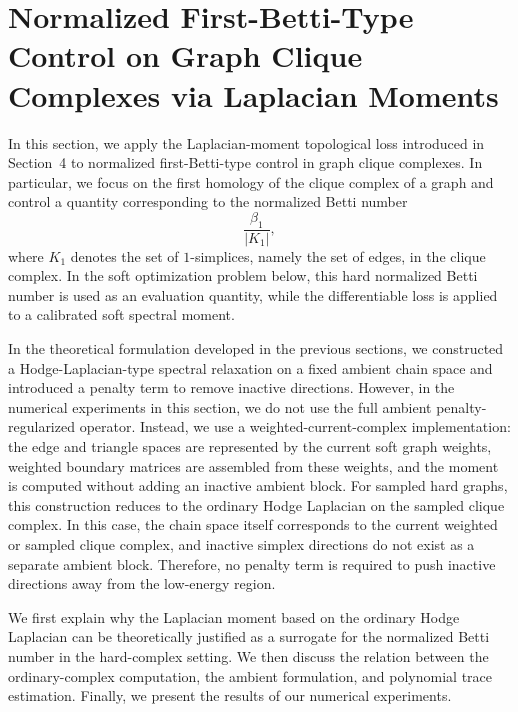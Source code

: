 \documentclass[pdflatex,sn-mathphys-ay]{sn-jnl}%
\theoremstyle{thmstyleone}%
\theoremstyle{thmstyletwo}%
\theoremstyle{thmstylethree}%
\begin{document}



\section{Normalized First-Betti-Type Control on Graph Clique Complexes via Laplacian Moments}
\label{sec:graph_experiments}

In this section, we apply the Laplacian-moment topological loss introduced in Section~4 to normalized first-Betti-type control in graph clique complexes. In particular, we focus on the first homology of the clique complex of a graph and control a quantity corresponding to the normalized Betti number
\[
\frac{\beta_1}{|K_1|},
\]
where \(K_1\) denotes the set of \(1\)-simplices, namely the set of edges, in the clique complex.
In the soft optimization problem below, this hard normalized Betti number is used as an evaluation quantity, while the differentiable loss is applied to a calibrated soft spectral moment.

In the theoretical formulation developed in the previous sections, we constructed a Hodge-Laplacian-type spectral relaxation on a fixed ambient chain space and introduced a penalty term to remove inactive directions. However, in the numerical experiments in this section, we do not use the full ambient penalty-regularized operator. Instead, we use a weighted-current-complex implementation: the edge and triangle spaces are represented by the current soft graph weights, weighted boundary matrices are assembled from these weights, and the moment is computed without adding an inactive ambient block. For sampled hard graphs, this construction reduces to the ordinary Hodge Laplacian on the sampled clique complex. In this case, the chain space itself corresponds to the current weighted or sampled clique complex, and inactive simplex directions do not exist as a separate ambient block. Therefore, no penalty term is required to push inactive directions away from the low-energy region.

We first explain why the Laplacian moment based on the ordinary Hodge Laplacian can be theoretically justified as a surrogate for the normalized Betti number in the hard-complex setting. We then discuss the relation between the ordinary-complex computation, the ambient formulation, and polynomial trace estimation. Finally, we present the results of our numerical experiments.
\end{document}
